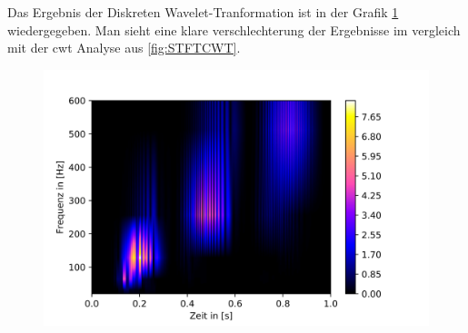 Das Ergebnis der Diskreten Wavelet-Tranformation ist in der Grafik \ref{fig:sin-sweep} wiedergegeben. Man sieht eine klare verschlechterung der Ergebnisse im vergleich mit der cwt Analyse aus \ref{fig:STFTCWT}. 

\begin{figure}[!ht]
	\centering
	\includegraphics[scale=0.3]{papers/autotune/sections/frequenzanalyse/images/sweepdwt.jpg}
	\label{fig:sin-sweep}
\end{figure}%


\newpage


